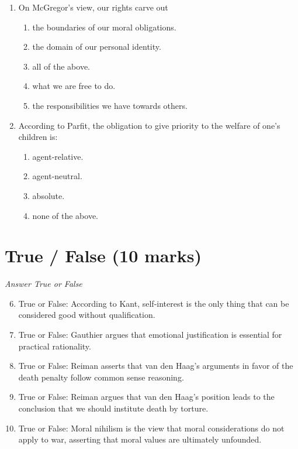 \documentclass[12pt]{article}
\begin{document}
\begin{enumerate}[label=\arabic*.]
\begin{enumerate}[label=(\alph*)]
    \item human behavior that is driven by basic needs.
\end{enumerate}
\item On McGregor's view, our rights carve out
\begin{enumerate}[label=(\alph*)]
    \item the boundaries of our moral obligations.
    \item the domain of our personal identity.
    \item all of the above.
    \item what we are free to do.
    \item the responsibilities we have towards others.
\end{enumerate}
\item According to Parfit, the obligation to give priority to the welfare of one's children is:
\begin{enumerate}[label=(\alph*)]
    \item agent-relative.
    \item agent-neutral.
    \item absolute.
    \item none of the above.
\end{enumerate}
\end{enumerate}

\section*{True / False (10 marks)}
\textit{Answer True or False}
\begin{enumerate}[label=\arabic*.]
\setcounter{enumi}{5}
\item True or False: According to Kant, self-interest is the only thing that can be considered good without qualification.
\item True or False: Gauthier argues that emotional justification is essential for practical rationality.
\item True or False: Reiman asserts that van den Haag's arguments in favor of the death penalty follow common sense reasoning.
\item True or False: Reiman argues that van den Haag's position leads to the conclusion that we should institute death by torture.
\item True or False: Moral nihilism is the view that moral considerations do not apply to war, asserting that moral values are ultimately unfounded.
\end{enumerate}
\end{document}
